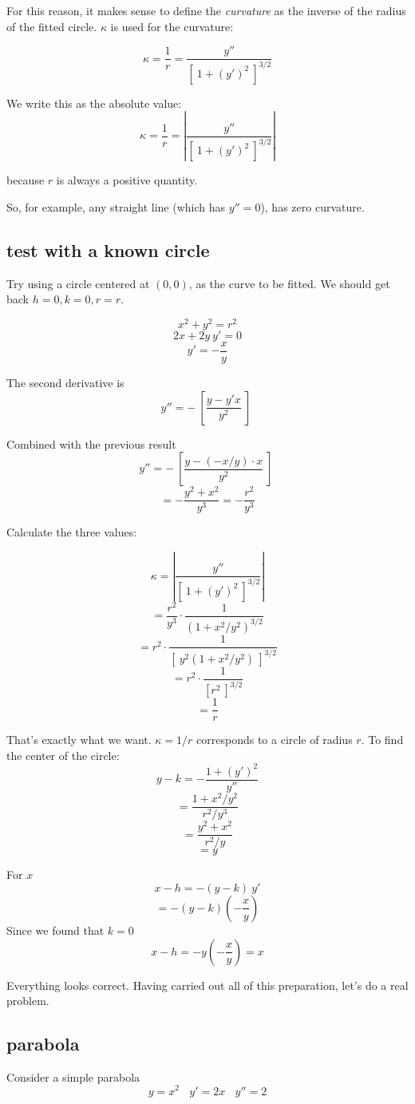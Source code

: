 \documentclass[11pt, oneside]{article}
\begin{document}
For this reason, it makes sense to define the \emph{curvature} as the inverse of the radius of the fitted circle.  $\kappa$ is used for the curvature:

\[ \kappa = \frac{1}{r} = \frac{y''}{[ \ 1 + (y')^2 \ ]^{3/2}} \]

We write this as the absolute value:
\[ \kappa = \frac{1}{r} = | \frac{y''}{[ \ 1 + (y')^2 \ ]^{3/2}} | \]

because $r$ is always a positive quantity.

So, for example, any straight line (which has $y'' = 0$), has zero curvature.

\subsection*{test with a known circle}
Try using a circle centered at $(0,0)$, as the curve to be fitted.  We should get back $h=0, k=0, r=r$.

\[ x^2 + y^2 = r^2 \]
\[ 2x + 2y \ y' = 0 \]
\[ y' = -\frac{x}{y} \]

The second derivative is
\[ y'' = - \ [ \frac{y - y' x}{y^2} \ ] \ \]

Combined with the previous result
\[ y'' = - \ [ \frac{y - (-x/y) \cdot x}{y^2} \ ] \ \]
\[ = - \frac{y^2 + x^2}{y^3} = - \frac{r^2}{y^3} \]

Calculate the three values:

\[ \kappa = | \frac{y''}{[ \ 1 + (y')^2 \ ]^{3/2}} | \]
\[ = \frac{r^2}{y^3} \cdot \frac{1}{(1 + x^2/y^2)^{3/2}} \]
\[ = r^2 \cdot \frac{1}{[ \ y^2(1 + x^2/y^2) \ ]^{3/2}} \]
\[ = r^2 \cdot \frac{1}{[ r^2\ ]^{3/2}} \]
\[ = \frac{1}{r} \]

That's exactly what we want.  $\kappa = 1/r$ corresponds to a circle of radius $r$.  To find the center of the circle:
\[ y - k = - \frac{1 + (y')^2}{y''} \]
\[ = \frac{1 + x^2/y^2}{r^2/y^3} \]
\[ = \frac{y^2 + x^2}{r^2/y} \]
\[ = y \]

For $x$
\[ x - h = -(y - k)\ y' \]
\[ = -(y - k) (-\frac{x}{y}) \]
Since we found that $k = 0$
\[ x - h = -y(-\frac{x}{y}) = x \]

Everything looks correct.  Having carried out all of this preparation, let's do a real problem.

\subsection*{parabola}

Consider a simple parabola
\[ y = x^2 \ \ \ \ y' = 2x \ \ \ \  y'' = 2 \]
\end{document}
